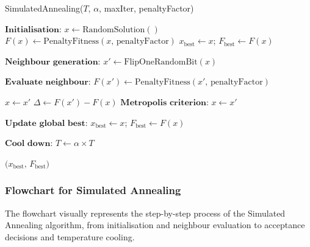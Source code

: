 \documentclass[12pt]{article}
\begin{document}
\begin{algorithm}[htbp]
  \caption{SimulatedAnnealing(\(T\), \(\alpha\), maxIter, penaltyFactor)}
  \label{alg:simulated_annealing}
  \begin{algorithmic}[1]
    \State \(\textbf{Initialisation:}\)
    \State \(x \gets \text{RandomSolution}()\) 
    \State \(F(x) \gets \text{PenaltyFitness}(x,\, \text{penaltyFactor})\) 
    \State \(x_{\text{best}} \gets x\); \quad \(F_{\text{best}} \gets F(x)\)

      \State \(\textbf{Neighbour generation:}\)
      \State \(x' \gets \text{FlipOneRandomBit}(x)\) 

      \State \(\textbf{Evaluate neighbour:}\)
      \State \(F(x') \gets \text{PenaltyFitness}(x',\, \text{penaltyFactor})\)

        \State \(x \gets x'\) 
      \Else
        \State \(\Delta \gets F(x') - F(x)\)
        \State \(\textbf{Metropolis criterion:}\)
          \State \(x \gets x'\) 
        \EndIf
      \EndIf

      \State \(\textbf{Update global best:}\)
        \State \(x_{\text{best}} \gets x\); \quad \(F_{\text{best}} \gets F(x)\)
      \EndIf

      \State \(\textbf{Cool down:}\)
      \State \(T \gets \alpha \times T\)
    \EndFor
    
    \State \Return \(\bigl(x_{\text{best}},\, F_{\text{best}}\bigr)\)
  \end{algorithmic}
\end{algorithm}

\subsubsection{Flowchart for Simulated Annealing}
The flowchart visually represents the step-by-step process of the Simulated Annealing algorithm, from initialisation and neighbour evaluation to acceptance decisions and temperature cooling.
\end{document}
